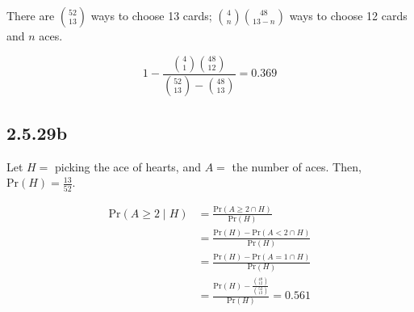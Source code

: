 \documentclass[12pt,letterpaper]{article}
\theoremstyle{definition}
\newcommand{\pr}[1]{\text{Pr}\left(#1\right)}
\begin{document}
There are $\binom{52}{13}$ ways to choose 13 cards; $\binom{4}{n}\binom{48}{13 -
n}$ ways to choose 12 cards and $n$ aces.

\[
  1 - \frac{\binom{4}{1}\binom{48}{12}}{\binom{52}{13} - \binom{48}{13}} = 0.369
\]

\subsection*{2.5.29b}

Let $H = $ picking the ace of hearts, and $A =$ the number of aces. Then,
$\pr{H} = \frac{13}{52}$.

\begin{align*}
  \pr{A \geq 2 \mid H} &= \frac{\pr{A \geq 2 \cap H}}{\pr{H}} \\
                       &= \frac{\pr{H} - \pr{A < 2 \cap H}}{\pr{H}} \\
                       &= \frac{\pr{H} - \pr{A = 1 \cap H}}{\pr{H}} \\
                       &= \frac{\pr{H} - \frac{\binom{48}{12}}{\binom{52}{13}}}{\pr{H}} = 0.561
\end{align*}
\end{document}

